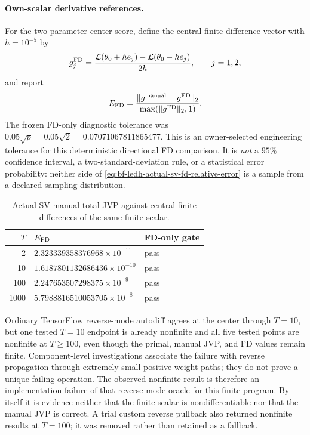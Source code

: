 \paragraph{Own-scalar derivative references.}
For the two-parameter center score, define the central finite-difference vector
with \(h=10^{-5}\) by
\begin{equation}
\label{eq:bf-ledh-actual-sv-fd-score}
  g^{\rm FD}_j
  =\frac{\mathcal L(\theta_0+h e_j)
          -\mathcal L(\theta_0-h e_j)}{2h},
  \qquad j=1,2,
\end{equation}
and report
\begin{equation}
\label{eq:bf-ledh-actual-sv-fd-relative-error}
  E_{\rm FD}
  =\frac{\lVert g^{\rm manual}-g^{\rm FD}\rVert_2}
         {\max(\lVert g^{\rm FD}\rVert_2,1)}.
\end{equation}
The frozen FD-only diagnostic tolerance was
\(0.05\sqrt p=0.05\sqrt2=0.07071067811865477\).  This is an owner-selected
engineering tolerance for this deterministic directional FD comparison.  It
is \emph{not} a \(95\%\) confidence interval, a two-standard-deviation rule, or
a statistical error probability: neither side of
\eqref{eq:bf-ledh-actual-sv-fd-relative-error} is a sample from a declared
sampling distribution.

\begin{table}[H]
\centering
\caption{Actual-SV manual total JVP against central finite differences of the
same finite scalar.}
\label{tab:bf-ledh-actual-sv-fd-results}
\begin{tabular}{@{}rll@{}}
\toprule
\(T\) & \(E_{\rm FD}\) & FD-only gate \\
\midrule
2    & \(2.323339358376968\times10^{-11}\) & pass \\
10   & \(1.6187801132686436\times10^{-10}\) & pass \\
100  & \(2.247653507298375\times10^{-9}\) & pass \\
1000 & \(5.7988816510053705\times10^{-8}\) & pass \\
\bottomrule
\end{tabular}
\end{table}

Ordinary TensorFlow reverse-mode autodiff agrees at the center through
\(T=10\), but one tested \(T=10\) endpoint is already nonfinite and all five
tested points are nonfinite at \(T\geq100\), even though the primal, manual JVP,
and FD values remain finite.  Component-level investigations associate the
failure with reverse propagation through extremely small positive-weight
paths; they do not prove a unique failing operation.  The observed nonfinite
result is therefore an implementation failure of that reverse-mode oracle for
this finite program.  By itself it is evidence neither that the finite scalar
is nondifferentiable nor that the manual JVP is correct.  A trial custom reverse
pullback also returned nonfinite results at \(T=100\); it was removed rather
than retained as a fallback.

